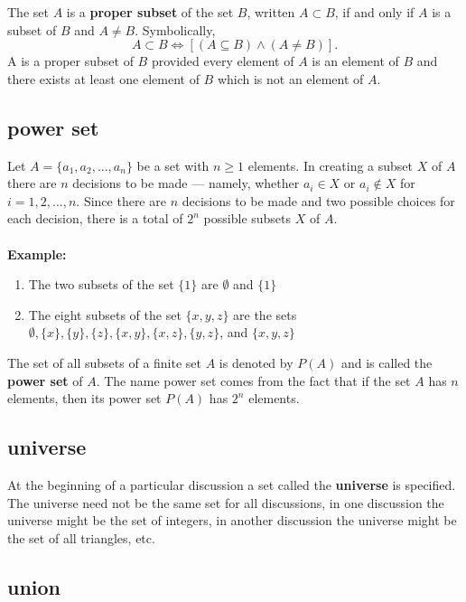 \documentclass{article}
\begin{document}
    The set $A$ is a \textbf{proper subset} of the set $B$, written $A \subset B$, if and only if $A$ is a subset of $B$ and $A \neq B$. Symbolically,
    \begin{equation}
    A \subset B \Leftrightarrow [(A \subseteq B) \wedge (A \neq B)].
    \end{equation}
    A is a proper subset of $B$ provided every element of $A$ is an element of $B$ and there exists at least one element of $B$ which is not an element of $A$.

    \subsection{power set}

    Let $A = \{ a_1,a_2,...,a_n\}$ be a set with $n \geq 1$ elements. In creating a subset $X$ of $A$ there are $n$ decisions to be made --- namely, whether $a_i \in X$ or $a_i \notin X$ for $i = 1,2,...,n$. Since there are $n$ decisions to be made and two possible choices for each decision, there is a total of $2^n$ possible subsets $X$ of $A$. \\
    \\
    \textbf{Example:}
    \begin{enumerate} 
    \item The two subsets of the set $\{1\}$ are $\emptyset$ and $\{1\}$
    \item The eight subsets of the set $\{ x,y,z\}$ are the sets $\emptyset, \{ x \}, \{ y \}, \{ z \},\{x,y\},\{x,z\},\{y,z\}$, and $\{x,y,z\}$
    \end{enumerate}

    The set of all subsets of a finite set $A$ is denoted by $P(A)$ and is called the \textbf{power set} of $A$. The name power set comes from the fact that if the set $A$ has $n$ elements, then its power set $P(A)$ has $2^n$ elements.

    \subsection{universe}

    At the beginning of a particular discussion a set called the \textbf{universe} is specified. The universe need not be the same set for all discussions, in one discussion the universe might be the set of integers, in another discussion the universe might be the set of all triangles, etc.

    \subsection{union}
\end{document}
